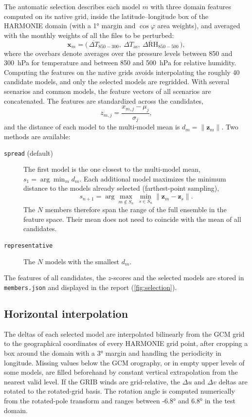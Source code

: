 \documentclass[11pt,a4paper]{article}
\newcommand{\code}[1]{\texttt{#1}}
\newcommand{\dT}{\Delta T}
\newcommand{\dRH}{\Delta \mathrm{RH}}
\begin{document}
The automatic selection describes each model $m$ with three domain features
computed on its native grid, inside the latitude--longitude box of the
HARMONIE domain (with a \ang{1} margin and $\cos\varphi$ area weights), and
averaged with the monthly weights of all the files to be perturbed:
\begin{equation}
  \mathbf{x}_m = \bigl(\, \overline{\dT}_{850-300},\ \Delta T_{\mathrm{as}},\
  \overline{\dRH}_{850-500} \,\bigr),
\end{equation}
where the overbars denote averages over the pressure levels between 850 and
\SI{300}{hPa} for temperature and between 850 and \SI{500}{hPa} for relative
humidity. Computing the features on the native grids avoids interpolating
the roughly 40 candidate models, and only the selected models are regridded.
With several scenarios and common models, the feature vectors of all
scenarios are concatenated. The features are standardized across the
candidates,
\begin{equation}
  z_{m,j} = \frac{x_{m,j} - \mu_j}{\sigma_j},
\end{equation}
and the distance of each model to the multi-model mean is
$d_m = \lVert \mathbf{z}_m \rVert$. Two methods are available:
\begin{description}
  \item[\code{spread} (default)] The first model is the one closest to the
    multi-model mean, $s_1 = \arg\min_m d_m$. Each additional model maximizes
    the minimum distance to the models already selected (farthest-point
    sampling),
    \begin{equation}
      s_{n+1} = \arg\max_{m \notin S_n}\ \min_{s \in S_n} \lVert \mathbf{z}_m - \mathbf{z}_s \rVert .
    \end{equation}
    The $N$ members therefore span the range of the full ensemble in the
    feature space. Their mean does not need to coincide with the mean of all
    candidates.
  \item[\code{representative}] The $N$ models with the smallest $d_m$.
\end{description}
The features of all candidates, the $z$-scores and the selected models are
stored in \code{members.json} and displayed in the report
(\cref{fig:selection}).

\subsection{Horizontal interpolation}

The deltas of each selected model are interpolated bilinearly from the GCM
grid to the geographical coordinates of every HARMONIE grid point, after
cropping a box around the domain with a \ang{3} margin and handling the
periodicity in longitude. Missing values below the GCM orography, or in
empty upper levels of some models, are filled beforehand by constant
vertical extrapolation from the nearest valid level. If the GRIB winds are
grid-relative, the $\Delta u$ and $\Delta v$ deltas are rotated to the
rotated-grid basis. The rotation angle is computed numerically from the
rotated-pole transform and ranges between \ang{-6.8} and \ang{6.8} in the
test domain.
\end{document}

